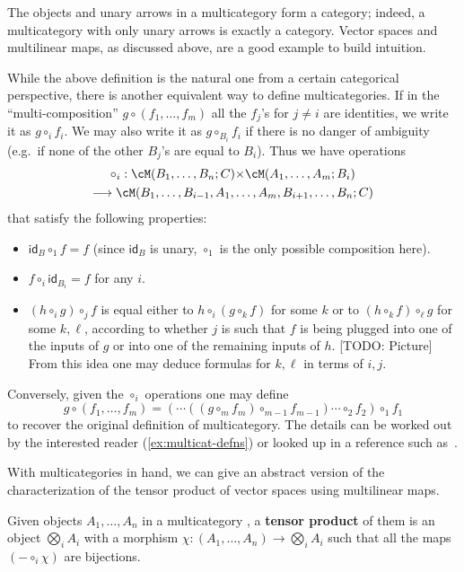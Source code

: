 \documentclass{book}
\def\idfunc{\mathsf{id}}
\let\bigtensor\bigotimes
\begin{document}
The objects and unary arrows in a multicategory form a category; indeed, a multicategory with only unary arrows is exactly a category.
Vector spaces and multilinear maps, as discussed above, are a good example to build intuition.

While the above definition is the natural one from a certain categorical perspective, there is another equivalent way to define multicategories.
If in the ``multi-composition'' $g\circ (f_1,\dots,f_m)$ all the $f_j$'s for $j\neq i$ are identities, we write it as $g \circ_i f_i$.
We may also write it as $g\circ_{B_i} f_i$ if there is no danger of ambiguity (e.g.\ if none of the other $B_j$'s are equal to $B_i$).
Thus we have operations
\begin{multline*}
  \circ_i : \cM(B_1,\dots,B_n;C) \times \cM(A_1,\dots,A_m;B_i) \\
  \too \cM(B_1,\dots,B_{i-1},A_1,\dots,A_m,B_{i+1},\dots,B_n;C)
\end{multline*}
that satisfy the following properties:
\begin{itemize}
\item $\idfunc_B \circ_1 f = f$ (since $\idfunc_B$ is unary, $\circ_1$ is the only possible composition here).
\item $f\circ_i \idfunc_{B_i} = f$ for any $i$.
\item $(h \circ_i g) \circ_{j} f$ is equal either to $h\circ_i (g\circ_k f)$ for some $k$ or to $(h\circ_k f)\circ_\ell g$ for some $k,\ell$, according to whether $j$ is such that $f$ is being plugged into one of the inputs of $g$ or into one of the remaining inputs of $h$.
  [TODO: Picture]
  From this idea one may deduce formulas for $k,\ell$ in terms of $i,j$.
\end{itemize}
Conversely, given the $\circ_i$ operations one may define
\[ g\circ (f_1,\dots,f_m) = (\cdots((g \circ_m f_m) \circ_{m-1} f_{m-1}) \cdots \circ_2 f_2) \circ_1 f_1 \]
to recover the original definition of multicategory.
The details can be worked out by the interested reader (\cref{ex:multicat-defns}) or looked up in a reference such as~\cite{leinster:higher-opds}.

With multicategories in hand, we can give an abstract version of the characterization of the tensor product of vector spaces using multilinear maps.
\begin{defn}\label{defn:multicat-tensor}
  Given objects $A_1,\dots,A_n$ in a multicategory \cM, a \textbf{tensor product} of them is an object $\bigtensor_i A_i$ with a morphism $\chi:(A_1,\dots,A_n) \to \bigtensor_i A_i$ such that all the maps $(-\circ_i \chi)$ are bijections.
\end{defn}
\end{document}
